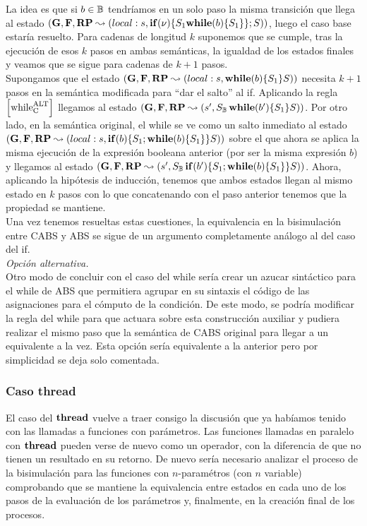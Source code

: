 La idea es que si $b \in \mathbb{B}$ tendríamos en un solo paso la misma transición que llega al estado $(\mathbf{G}, \mathbf{F}, \textbf{RP} \leadsto (local:s, \mbox{\textbf{if}} (\nu) \{S_1\mbox{\textbf{while}} (b) \{S_1\}\}\mbox{;\,}S))$, luego el caso base estaría resuelto. Para cadenas de longitud $k$ suponemos que se cumple, tras la ejecución de esos $k$ pasos en ambas semánticas, la igualdad de los estados finales y veamos que se sigue para cadenas de $k+1$ pasos.\\

Supongamos que el estado $(\mathbf{G}, \mathbf{F}, \textbf{RP} \leadsto (local:s, \mbox{\textbf{while}} (b) \{S_1\}S))$ necesita $k+1$ pasos en la semántica modificada para ``dar el salto'' al if. Aplicando la regla $\left[ \text{while}_{\text{C}}^{\text{ALT}} \right]$ llegamos al estado $(\mathbf{G}, \mathbf{F}, \textbf{RP} \leadsto (s', S_{\mathbb{B}}\,\mbox{\textbf{while}} (b') \{S_1\}S))$. Por otro lado, en la semántica original, el while se ve como un salto inmediato al estado $(\mathbf{G}, \mathbf{F}, \textbf{RP} \leadsto (local:s, \mbox{\textbf{if}} (b) \{S_1\mbox{;\,}\mbox{\textbf{while}} (b) \{S_1\}\}S))$ sobre el que ahora se aplica la misma ejecución de la expresión booleana anterior (por ser la misma expresión $b$) y llegamos al estado $(\mathbf{G}, \mathbf{F}, \textbf{RP} \leadsto (s', S_{\mathbb{B}}\,\mbox{\textbf{if}} (b') \{S_1\mbox{;\,}\mbox{\textbf{while}} (b) \{S_1\}\}S))$. Ahora, aplicando la hipótesis de inducción, tenemos que ambos estados llegan al mismo estado en $k$ pasos con lo que concatenando con el paso anterior tenemos que la propiedad se mantiene.\\

Una vez tenemos resueltas estas cuestiones, la equivalencia en la bisimulación entre CABS y ABS se sigue de un argumento completamente análogo al del caso del if.\\

\textit{Opción alternativa.}\\

Otro modo de concluir con el caso del while sería crear un azucar sintáctico para el while de ABS que permitiera agrupar en su sintaxis el código de las asignaciones para el cómputo de la condición. De este modo, se podría modificar la regla del while para que actuara sobre esta construcción auxiliar y pudiera realizar el mismo paso que la semántica de CABS original para llegar a un equivalente a la vez. Esta opción sería equivalente a la anterior pero por simplicidad se deja solo comentada.

\subsubsection{Caso thread}

El caso del $\textbf{thread}$ vuelve a traer consigo la discusión que ya habíamos tenido con las llamadas a funciones con parámetros. Las funciones llamadas en paralelo con $\textbf{thread}$ pueden verse de nuevo como un operador, con la diferencia de que no tienen un resultado en su retorno. De nuevo sería necesario analizar el proceso de la bisimulación para las funciones con $n$-paramétros (con $n$ variable) comprobando que se mantiene la equivalencia entre estados en cada uno de los pasos de la evaluación de los parámetros y, finalmente, en la creación final de los procesos.\\

